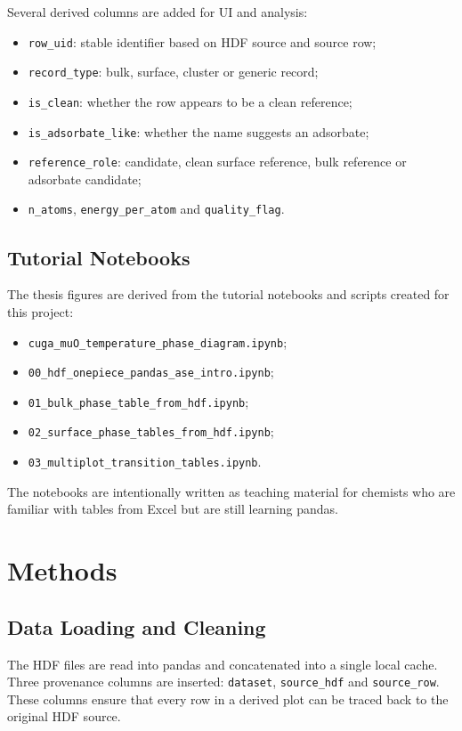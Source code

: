 \documentclass[12pt,a4paper,oneside]{report}
\begin{document}
Several derived columns are added for UI and analysis:
\begin{itemize}
  \item \texttt{row\_uid}: stable identifier based on HDF source and source row;
  \item \texttt{record\_type}: bulk, surface, cluster or generic record;
  \item \texttt{is\_clean}: whether the row appears to be a clean reference;
  \item \texttt{is\_adsorbate\_like}: whether the name suggests an adsorbate;
  \item \texttt{reference\_role}: candidate, clean surface reference, bulk
  reference or adsorbate candidate;
  \item \texttt{n\_atoms}, \texttt{energy\_per\_atom} and
  \texttt{quality\_flag}.
\end{itemize}

\section{Tutorial Notebooks}

The thesis figures are derived from the tutorial notebooks and scripts created
for this project:
\begin{itemize}
  \item \texttt{cuga\_muO\_temperature\_phase\_diagram.ipynb};
  \item \texttt{00\_hdf\_onepiece\_pandas\_ase\_intro.ipynb};
  \item \texttt{01\_bulk\_phase\_table\_from\_hdf.ipynb};
  \item \texttt{02\_surface\_phase\_tables\_from\_hdf.ipynb};
  \item \texttt{03\_multiplot\_transition\_tables.ipynb}.
\end{itemize}
The notebooks are intentionally written as teaching material for chemists who
are familiar with tables from Excel but are still learning pandas.

\chapter{Methods}

\section{Data Loading and Cleaning}

The HDF files are read into pandas and concatenated into a single local cache.
Three provenance columns are inserted:
\texttt{dataset}, \texttt{source\_hdf} and \texttt{source\_row}. These columns
ensure that every row in a derived plot can be traced back to the original HDF
source.
\end{document}
